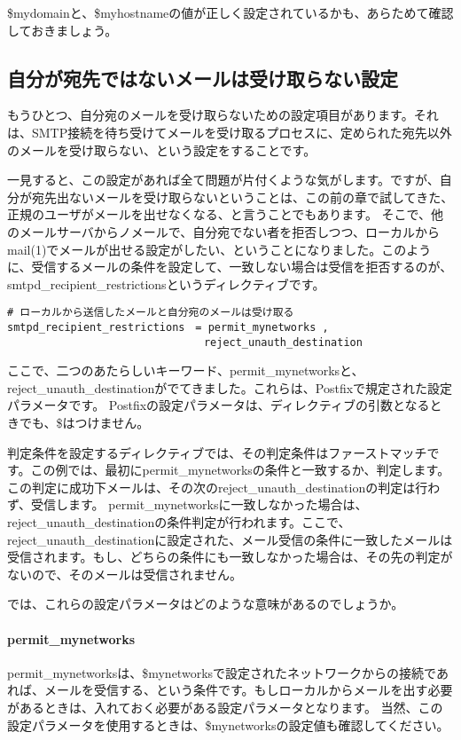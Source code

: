 \$mydomainと、\$myhostnameの値が正しく設定されているかも、あらためて確認しておきましょう。

\subsection{自分が宛先ではないメールは受け取らない設定}
もうひとつ、自分宛のメールを受け取らないための設定項目があります。それは、SMTP接続を待ち受けてメールを受け取るプロセスに、定められた宛先以外のメールを受け取らない、という設定をすることです。

一見すると、この設定があれば全て問題が片付くような気がします。ですが、自分が宛先出ないメールを受け取らないということは、この前の章で試してきた、正規のユーザがメールを出せなくなる、と言うことでもあります。
そこで、他のメールサーバからノメールで、自分宛でない者を拒否しつつ、ローカルからmail(1)でメールが出せる設定がしたい、ということになりました。このように、受信するメールの条件を設定して、一致しない場合は受信を拒否するのが、smtpd\_recipient\_restrictionsというディレクティブです。

\begin{lstlisting}[basicstyle=\ttfamily\footnotesize, frame=single]
# ローカルから送信したメールと自分宛のメールは受け取る
smtpd_recipient_restrictions　= permit_mynetworks ,
                               reject_unauth_destination
\end{lstlisting}

ここで、二つのあたらしいキーワード、permit\_mynetworksと、reject\_unauth\_destinationがでてきました。これらは、Postfixで規定された設定パラメータです。
Postfixの設定パラメータは、ディレクティブの引数となるときでも、\$はつけません。

判定条件を設定するディレクティブでは、その判定条件はファーストマッチです。この例では、最初にpermit\_mynetworksの条件と一致するか、判定します。この判定に成功下メールは、その次のreject\_unauth\_destinationの判定は行わず、受信します。
permit\_mynetworksに一致しなかった場合は、reject\_unauth\_destinationの条件判定が行われます。ここで、reject\_unauth\_destinationに設定された、メール受信の条件に一致したメールは受信されます。もし、どちらの条件にも一致しなかった場合は、その先の判定がないので、そのメールは受信されません。

では、これらの設定パラメータはどのような意味があるのでしょうか。

\paragraph{permit\_mynetworks}
permit\_mynetworksは、\$mynetworksで設定されたネットワークからの接続であれば、メールを受信する、という条件です。もしローカルからメールを出す必要があるときは、入れておく必要がある設定パラメータとなります。
当然、この設定パラメータを使用するときは、\$mynetworksの設定値も確認してください。

